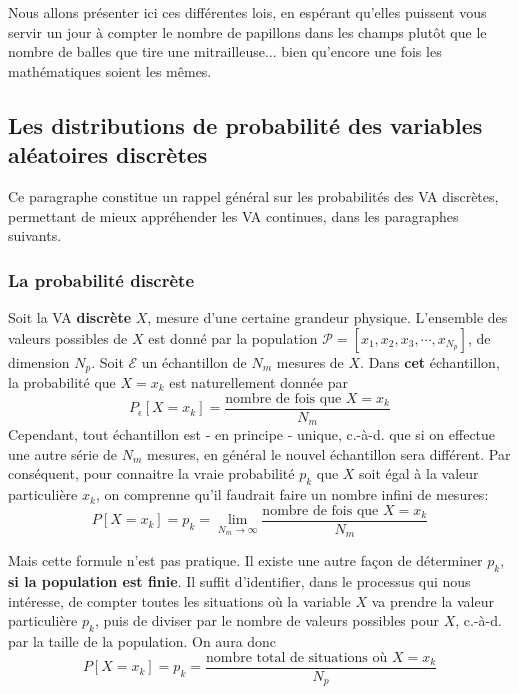 \documentclass[main.tex]{subfiles}
\begin{document}
Nous allons présenter ici ces différentes lois, en espérant qu'elles puissent vous servir un jour à compter le nombre de papillons dans les champs plutôt que le nombre de balles que tire  une mitrailleuse... bien qu'encore une fois les mathématiques soient les mêmes.

\subsection{Les distributions de probabilité des variables aléatoires discrètes}

Ce paragraphe constitue un rappel général sur les probabilités des VA discrètes, permettant de mieux appréhender les VA continues, dans les paragraphes suivants.

\subsubsection{La probabilité discrète}

Soit la VA \textbf{discrète} $X$, mesure d'une certaine grandeur physique. L'ensemble des valeurs possibles de $X$ est donné par la population $\mathcal{P}=[x_1,x_2,x_3,\cdots,x_{N_p}]$, de dimension $N_p$.
Soit $\mathcal{E}$ un échantillon de $N_m$ mesures de $X$. Dans \textbf{cet} échantillon, la probabilité que $X=x_k$ est naturellement donnée par
\begin{equation}
    P_\epsilon[X=x_k]=
    \frac{\text{nombre de fois que $X=x_k$}}
    {N_m}
\end{equation}
Cependant, tout échantillon est - en principe - unique, c.-à-d. que si on effectue une autre série de $N_m$ mesures, en général le nouvel échantillon sera différent. Par conséquent, pour connaitre la vraie probabilité $p_k$ que $X$ soit égal à la valeur particulière $x_k$, on comprenne qu'il faudrait faire un nombre infini de mesures:
\begin{equation}
    P[X=x_k]=p_k=\lim_{N_m\rightarrow\infty}
    \frac{\text{nombre de fois que $X=x_k$}}{N_m}
\end{equation}

Mais cette formule n'est pas pratique. Il existe une autre façon de déterminer $p_k$, \textbf{si la population est finie}. Il suffit d'identifier, dans le processus qui nous intéresse, de compter toutes les situations où la variable $X$ va prendre la valeur particulière $p_k$, puis de diviser par le nombre de valeurs possibles pour $X$, c.-à-d. par la taille de la population. On aura donc
\begin{equation}
    P[X=x_k]=p_k=\frac{\text{nombre total de situations où $X=x_k$}}{N_p}
    \label{eq:ddlp2}
\end{equation}
\end{document}
